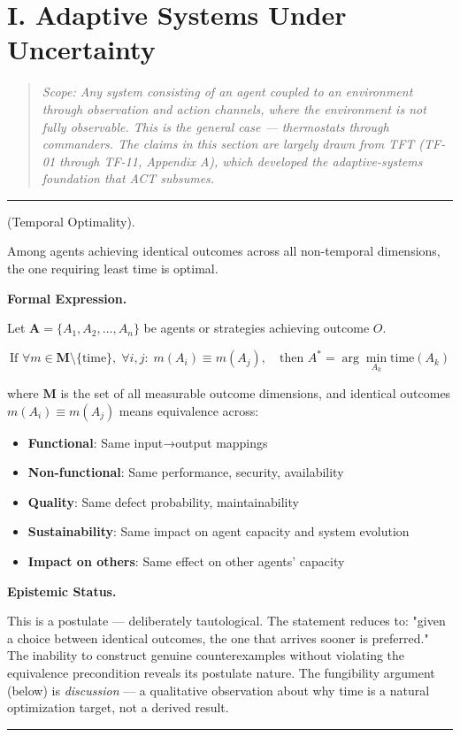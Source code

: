 \documentclass[11pt,oneside]{article}
\newcounter{claim}[section]
\renewcommand{\theclaim}{\thesection.\arabic{claim}}
\newenvironment{segment}[2]{%
  \refstepcounter{claim}%
  \bigskip\noindent\hrule\smallskip
  \noindent{\bfseries #1~\theclaim}\enskip(#2).\par\smallskip
  \noindent\ignorespaces
}{%
  \par\smallskip\noindent\hrule\bigskip
}
\newenvironment{postulate}[1][]{\begin{segment}{Postulate}{#1}}{\end{segment}}
\begin{document}
\section{I. Adaptive Systems Under Uncertainty}

\begin{quote}\itshape
Scope: Any system consisting of an agent coupled to an environment through observation and action channels, where the environment is not fully observable. This is the general case — thermostats through commanders. The claims in this section are largely drawn from TFT (TF-01 through TF-11, Appendix A), which developed the adaptive-systems foundation that ACT subsumes.
\end{quote}

\begin{postulate}[Temporal Optimality]
\label{temporal-optimality}
Among agents achieving identical outcomes across all non-temporal dimensions, the one requiring least time is optimal.



\medskip\noindent\textbf{Formal Expression.}



Let $\mathbf{A} = \{A_1, A_2, \ldots, A_n\}$ be agents or strategies achieving outcome $O$.

$$\text{If } \forall m \in \mathbf{M} \setminus \{\text{time}\},\; \forall i,j:\; m(A_i) \equiv m(A_j), \quad \text{then } A^* = \arg\min_{A_k} \text{time}(A_k)$$

where $\mathbf{M}$ is the set of all measurable outcome dimensions, and identical outcomes $m(A_i) \equiv m(A_j)$ means equivalence across:
\begin{itemize}
  \item \textbf{Functional}: Same input→output mappings
  \item \textbf{Non-functional}: Same performance, security, availability
  \item \textbf{Quality}: Same defect probability, maintainability
  \item \textbf{Sustainability}: Same impact on agent capacity and system evolution
  \item \textbf{Impact on others}: Same effect on other agents' capacity
\end{itemize}



\medskip\noindent\textbf{Epistemic Status.}


This is a postulate — deliberately tautological. The statement reduces to: "given a choice between identical outcomes, the one that arrives sooner is preferred." The inability to construct genuine counterexamples without violating the equivalence precondition reveals its postulate nature. The fungibility argument (below) is \textit{discussion} — a qualitative observation about why time is a natural optimization target, not a derived result.



\end{postulate}
\end{document}
